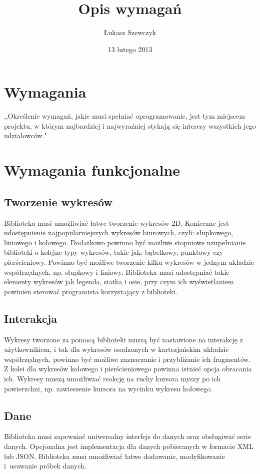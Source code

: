 \documentclass[11pt,twoside,a4paper,final]{llncs}
\begin{document}
\date{13 lutego 2013}
\title{Opis wymagań}

\author{Łukasz Szewczyk}
\maketitle

\section{Wymagania}
,,Określenie wymagań, jakie musi spełniać oprogramowanie, jest tym miejscem projektu, w którym najbardziej i najwyraźniej stykają się interesy wszystkich jego udziałowców."~\cite{sacha-wymagania}

\section{Wymagania funkcjonalne}

\subsection{Tworzenie wykresów}
Biblioteka musi umożliwiać łatwe tworzenie wykresów 2D. Konieczne jest udostępnienie najpopularniejszych wykresów biurowych, czyli: słupkowego, liniowego i kołowego. Dodatkowo powinno być możliwe stopniowe uzupełnianie biblioteki o kolejne typy wykresów, takie jak: bąbelkowy, punktowy czy pierścieniowy. Powinno być możliwe tworzenie kilku wykresów w jednym układzie współrzędnych, np. słupkowy i liniowy.
Biblioteka musi udostępniać takie elementy wykresów jak legenda, siatka i osie, przy czym ich wyświetlaniem powinien sterować programista korzystający z biblioteki.

\subsection{Interakcja}
Wykresy tworzone za pomocą biblioteki muszą być nastawione na interakcję z użytkownikiem, i tak dla wykresów osadzonych w kartezjańskim układzie współrzędnych, powinno być możliwe zaznaczanie i przybliżanie ich fragmentów. Z kolei dla wykresów kołowego i pierścieniowego powinna istnieć opcja obracania ich. Wykresy muszą umożliwiać reakcję na ruchy kursora myszy po ich powierzchni, np. zawieszenie kursora na wycinku wykresu kołowego.

\subsection{Dane}
Biblioteka musi zapewniać uniwersalny interfejs do danych oraz obsługiwać serie danych. Opcjonalna jest implementacja dla danych pobieranych w formacie XML lub JSON. Biblioteka musi umożliwiać łatwe dodawanie, modyfikowanie i~usuwanie próbek danych.
\end{document}
